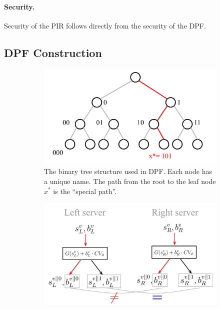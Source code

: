 \paragraph{Security.}
Security of the PIR follows directly from the security of the DPF.



\subsection{DPF Construction}

\begin{figure}[t]
    \centering

    \begin{subfigure}{0.48\textwidth}
     \includegraphics[width=\textwidth]{DPFtree.pdf}
     \caption{The binary tree structure used in DPF. Each node has a unique name. The path from the root to the leaf node $x^*$ is the ``special path''.}
\label{fig:tree}
    \end{subfigure}   
    \hfill
     \begin{subfigure}{0.48\textwidth}
        \includegraphics[width=\textwidth]{DPF1.pdf}

\end{subfigure}
\end{figure}
